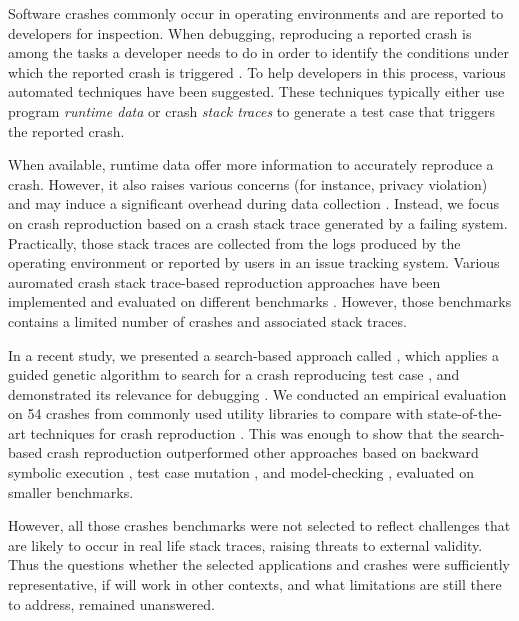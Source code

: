 
Software crashes commonly occur in operating environments and are reported to developers for inspection.
When debugging, reproducing a reported crash is among the tasks a developer needs to do in order to identify the conditions under which the reported crash is triggered \cite{Zeller2009}.
To help developers in this process, various automated techniques have been suggested.
These techniques typically either use program \emph{runtime data} \cite{Artzi2008, Clause2007, Narayanasamy2005, Steven2000, Gomez2016, Bell2013, Cao2014, Rossler2013} or crash \emph{stack traces} \cite{BPT17concrash, soltani2017, Nayrolles2017, Xuan2015, Chen2015} to generate a test case that triggers the reported crash.  

When available, runtime data offer more information to accurately reproduce a crash. However, it also raises various concerns (for instance, privacy violation) and may induce a significant overhead during data collection \cite{Chen2015, Nayrolles2017, Rossler2013}. Instead, we focus on crash reproduction based on a crash stack trace generated by a failing system. Practically, those stack traces are collected from the logs produced by the operating environment or reported by users in an issue tracking system. Various auromated crash stack trace-based reproduction approaches have been implemented and evaluated on different benchmarks \cite{soltani2017, Nayrolles2017, Xuan2015, Chen2015}. However, those benchmarks contains a limited number of crashes and associated stack traces.

In a recent study, we presented a search-based approach called \evocrash, which applies a guided genetic algorithm to search for a crash reproducing test case \cite{soltani2017}, and demonstrated its relevance for debugging \cite{Soltani2018a}.
We conducted an empirical evaluation on 54 crashes from commonly used utility libraries to compare \evocrash with state-of-the-art techniques for crash reproduction \cite{soltani2017}.
This was enough to show that the search-based crash reproduction outperformed other approaches based on backward symbolic execution \cite{Chen2015}, test case mutation \cite{Xuan2015}, and model-checking \cite{Nayrolles2017}, evaluated on smaller benchmarks.

However, all those crashes benchmarks were not selected to reflect challenges that are likely to occur in real life stack traces, raising threats to external validity.
Thus the questions whether the selected applications and crashes were sufficiently representative, if \evocrash will work in other contexts, and what limitations are still there to address, remained unanswered.

